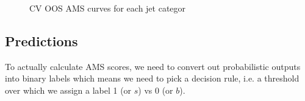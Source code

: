 \begin{figure}[htbp]
    \begin{adjustbox}{max width=1.4\linewidth,center}
    \centering
     \hspace*{-0.9em}
     \hspace*{-0.9em}
    \end{adjustbox}
    \caption{CV OOS AMS curves for each jet categor}
    \label{fig:img}
\end{figure}


\label{table:1}

\subsection{Predictions}
To actually calculate AMS scores, we need to convert out probabilistic outputs into binary labels which means we need to pick a decision rule, i.e. a threshold over which we assign a label 1 (or $s$) vs 0 (or $b$).

